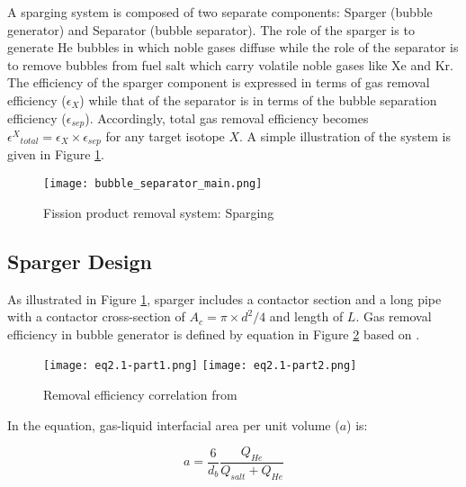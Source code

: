     A sparging system is composed of two separate components: Sparger (bubble generator) and Separator (bubble separator). The role of the sparger is to generate He bubbles in which noble gases diffuse while the role of the separator is to remove bubbles from fuel salt which carry volatile noble gases like Xe and Kr. The efficiency of the sparger component is expressed in terms of gas removal efficiency ($\epsilon_{X}$) while that of the separator is in terms of the bubble separation efficiency ($\epsilon_{sep}$). Accordingly, total gas removal efficiency becomes ${\epsilon^{X}}_{total} = \epsilon_{X} \times \epsilon_{sep}$ for any target isotope $X$. A simple illustration of the system is given in Figure \ref{fig:sparging}.

    \begin{figure}[htbp!]
        \begin{center}
            \texttt{[image: bubble\_separator\_main.png]}
        \end{center}
        \caption{Fission product removal system: Sparging}
        \label{fig:sparging}
    \end{figure}

\subsection{Sparger Design}

 As illustrated in Figure \ref{fig:sparging}, sparger includes a contactor section and a long pipe with a contactor cross-section of $A_c = \pi\times d^2/4$ and length of $L$. Gas removal efficiency in bubble generator is defined by equation in Figure \ref{fig:eq2} based on \cite{peebles_removal_1968}.

    \begin{figure}[h!]
        \begin{center}
            \texttt{[image: eq2.1-part1.png]}
            \texttt{[image: eq2.1-part2.png]}
        \end{center}
        \caption{Removal efficiency correlation from \cite{peebles_removal_1968}}
        \label{fig:eq2}
    \end{figure}

    In the equation, gas-liquid interfacial area per unit volume ($a$) is:

    \begin{equation}\label{interfacial}
        a = \frac{6}{d_b} \frac{Q_{He}}{Q_{salt}+Q_{He}}
    \end{equation}

